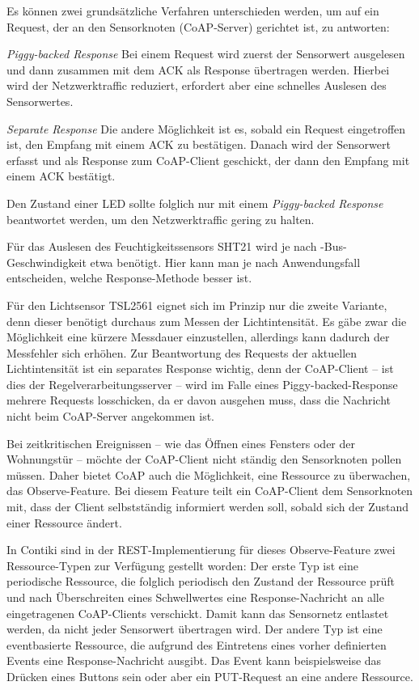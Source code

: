 	Es können zwei grundsätzliche Verfahren unterschieden werden,
	um auf ein Request, der an den Sensorknoten (CoAP-Server) gerichtet
	ist, zu antworten:
	\begin{LaTeXdescription}
	\item[\normalfont\itshape Piggy-backed Response]
		Bei einem Request wird zuerst der
		Sensorwert ausgelesen und dann zusammen mit dem ACK
		als Response übertragen werden. Hierbei wird der
		Netzwerktraffic reduziert, erfordert aber eine schnelles
		Auslesen des Sensorwertes.
	\item[\normalfont\itshape Separate Response]
		Die andere Möglichkeit ist es, sobald ein Request eingetroffen
		ist, den Empfang mit einem ACK zu bestätigen.
		Danach wird der Sensorwert erfasst und als Response zum
		CoAP-Client geschickt, der dann den Empfang mit einem ACK
		bestätigt.
		\label{sec:coap:separateresponse}
	\end{LaTeXdescription}

	Den Zustand einer LED sollte folglich nur mit einem
	\emph{Piggy-backed Response} beantwortet werden, um den Netzwerktraffic
	gering zu halten.

	Für das Auslesen des Feuchtigkeitssensors SHT21 wird je
	nach \ItC-Bus-Geschwindigkeit etwa  benötigt.
	Hier kann man je nach Anwendungsfall entscheiden, welche
	Response-Methode besser ist.

	Für den Lichtsensor TSL2561 eignet sich im Prinzip nur die zweite
	Variante, denn dieser benötigt durchaus
	 zum Messen der Lichtintensität.
	Es gäbe zwar die Möglichkeit eine kürzere Messdauer einzustellen,
	allerdings kann dadurch der Messfehler sich erhöhen.
	Zur Beantwortung des Requests der aktuellen Lichtintensität
	ist ein separates Response wichtig, denn der CoAP-Client
	-- \idR ist dies der Regelverarbeitungsserver --
	wird im Falle eines Piggy-backed-Response mehrere Requests losschicken,
	da er davon ausgehen muss, dass die Nachricht nicht beim CoAP-Server
	angekommen ist.

	Bei zeitkritischen Ereignissen -- wie das Öffnen eines Fensters oder
	der Wohnungstür -- möchte der CoAP-Client nicht ständig den
	Sensorknoten pollen müssen. Daher bietet CoAP auch die Möglichkeit,
	eine Ressource zu überwachen, das Observe-Feature.
	Bei diesem Feature teilt ein CoAP-Client dem Sensorknoten mit, dass
	der Client selbstständig informiert werden soll,
	sobald sich der Zustand einer Ressource ändert.

	In Contiki sind in der REST-Implementierung für dieses Observe-Feature
	zwei Ressource-Typen zur Verfügung gestellt worden:
	Der erste Typ ist eine periodische Ressource, die folglich periodisch
	den Zustand der Ressource prüft und \idR nach Überschreiten eines
	Schwellwertes eine Response-Nachricht an alle eingetragenen
	CoAP-Clients verschickt. Damit kann das Sensornetz entlastet werden, da
	nicht jeder Sensorwert übertragen wird.
	Der andere Typ ist eine eventbasierte Ressource, die aufgrund des
	Eintretens eines vorher definierten Events eine Response-Nachricht
	ausgibt.  Das Event kann beispielsweise das Drücken eines Buttons sein
	oder aber ein PUT-Request an eine andere Ressource.

